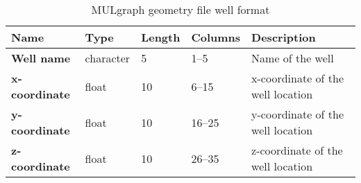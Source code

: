 \begin{table}[h]
  \begin{center}
    \begin{tabular}{|p{20mm}|l|l|l|p{50mm}|}
      \hline
      \textbf{Name} & \textbf{Type} & \textbf{Length} & \textbf{Columns} & \textbf{Description}\\
      \hline
      \textbf{Well name} & character & 5 & 1--5 & Name of the well\\
      \hline
      \textbf{x-coordinate} & float & 10 & 6--15 & x-coordinate of the well location\\
      \hline
      \textbf{y-coordinate} & float & 10 & 16--25 & y-coordinate of the well location\\
      \hline
      \textbf{z-coordinate} & float & 10 & 26--35 & z-coordinate of the well location\\
      \hline
    \end{tabular}
    \caption{MULgraph geometry file well format}
    \label{tb:mulgraph_format_wells}
  \end{center}
\end{table}

